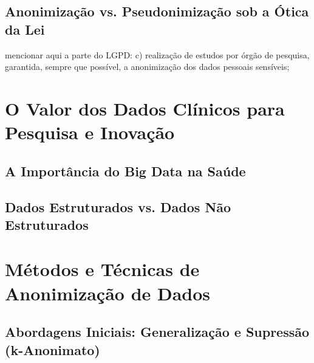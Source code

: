\subsection{Anonimização vs. Pseudonimização sob a Ótica da Lei}
\label{subsec:fund-anon-pseudo}

mencionar aqui a parte do LGPD: c)  realização  de  estudos  por  órgão  de  pesquisa, garantida,  sempre  que  possível,  a  anonimização  dos  dados  pessoais  sensíveis;

\section{O Valor dos Dados Clínicos para Pesquisa e Inovação}
\label{sec:fund-valor-dados}

\subsection{A Importância do Big Data na Saúde}
\label{subsec:fund-bigdata}

\subsection{Dados Estruturados vs. Dados Não Estruturados}
\label{subsec:fund-dados-estruturados}

\section{Métodos e Técnicas de Anonimização de Dados}
\label{sec:fund-metodos-anon}

\subsection{Abordagens Iniciais: Generalização e Supressão (k-Anonimato)}
\label{subsec:fund-k-anonimato}

